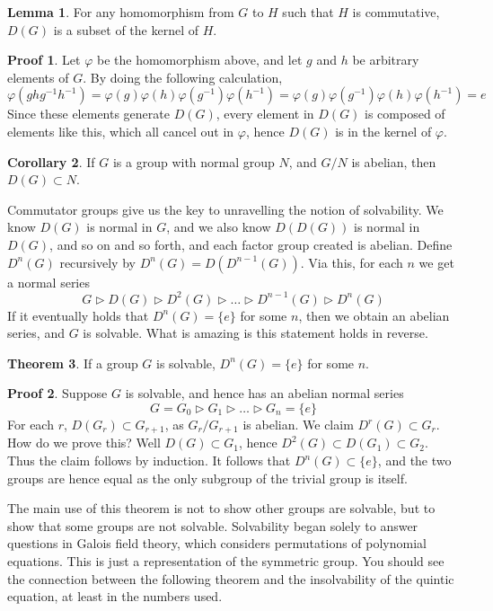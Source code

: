 \documentclass[12pt]{amsbook}
\theoremstyle{definition}
\newtheorem{theorem}{Theorem}[chapter]
\newtheorem{lemma}[theorem]{Lemma}
\newtheorem{corollary}[theorem]{Corollary}
\newtheorem*{prf}{Proof}
\begin{document}
\begin{lemma}
    For any homomorphism from $G$ to $H$ such that $H$ is commutative, $D(G)$ is a subset of the kernel of $H$.
\end{lemma}
\begin{prf}
    Let $\varphi$ be the homomorphism above, and let $g$ and $h$ be arbitrary elements of $G$. By doing the following calculation,
    \[ \varphi(ghg^{-1}h^{-1}) = \varphi(g)\varphi(h)\varphi(g^{-1})\varphi(h^{-1}) = \varphi(g)\varphi(g^{-1})\varphi(h)\varphi(h^{-1}) = e \]
    Since these elements generate $D(G)$, every element in $D(G)$ is composed of elements like this, which all cancel out in $\varphi$, hence $D(G)$ is in the kernel of $\varphi$.
\end{prf}

\begin{corollary}
    If $G$ is a group with normal group $N$, and $G/N$ is abelian, then $D(G) \subset N$.
\end{corollary}

Commutator groups give us the key to unravelling the notion of solvability. We know $D(G)$ is normal in $G$, and we also know $D(D(G))$ is normal in $D(G)$, and so on and so forth, and each factor group created is abelian. Define $D^n(G)$ recursively by $D^n(G) = D(D^{n-1}(G))$. Via this, for each $n$ we get a normal series
%
\[ G \rhd D(G) \rhd D^2(G) \rhd \dots \rhd D^{n-1}(G) \rhd D^n(G) \]
%
If it eventually holds that $D^n(G) = \{e\}$ for some $n$, then we obtain an abelian series, and $G$ is solvable. What is amazing is this statement holds in reverse.

\begin{theorem}
    If a group $G$ is solvable, $D^n(G) = \{e\}$ for some $n$.
\end{theorem}
\begin{prf}
    Suppose $G$ is solvable, and hence has an abelian normal series
    \[ G = G_0 \rhd G_1 \rhd \dots \rhd G_n = \{e\} \]
    For each $r$, $D(G_r) \subset G_{r+1}$, as $G_r/G_{r+1}$ is abelian. We claim $D^r(G) \subset G_r$. How do we prove this? Well $D(G) \subset G_1$, hence $D^2(G) \subset D(G_1) \subset G_2$. Thus the claim follows by induction. It follows that $D^n(G) \subset \{e\}$, and the two groups are hence equal as the only subgroup of the trivial group is itself.
\end{prf}

The main use of this theorem is not to show other groups are solvable, but to show that some groups are not solvable. Solvability began solely to answer questions in Galois field theory, which considers permutations of polynomial equations. This is just a representation of the symmetric group. You should see the connection between the following theorem and the insolvability of the quintic equation, at least in the numbers used.
\end{document}
